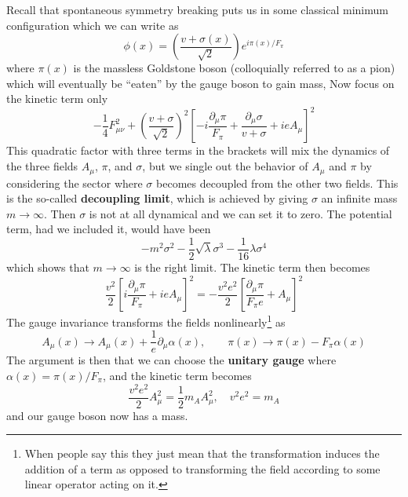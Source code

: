 \documentclass{report}
\begin{document}
 Recall that spontaneous symmetry breaking puts us in
some classical minimum configuration which we can write as 
\begin{equation*}
	\phi(x) = \left(\frac{v+\sigma(x)}{\sqrt{2}}\right) e^{i\pi(x)/F_\pi}
\end{equation*}
where $ \pi(x) $ is the massless Goldstone boson (colloquially referred to as a pion) which will eventually be 
``eaten'' by the gauge boson to gain mass,
Now focus on the kinetic term only
\begin{equation*}
	-\frac{1}{4} F_{\mu\nu}^2 +  \left(\frac{v+\sigma}{\sqrt{2}}\right)^2 
		\left[-i \frac{\partial_\mu \pi}{F_\pi} + \frac{\partial_\mu \sigma}{v+\sigma}
			+ ieA_\mu\right]^2
\end{equation*}
This quadratic factor with three terms in the brackets will mix the dynamics 
of the three fields $ A_\mu $, $ \pi $, and $ \sigma $, but we single out the 
behavior of $ A_\mu $ and $ \pi $ by considering the sector where $ \sigma $
becomes decoupled from the other two fields. This is the so-called \textbf{decoupling 
limit}, which is achieved by giving $ \sigma $ an infinite mass $ m \rightarrow \infty $. 
Then $ \sigma $ is not at all dynamical and we can set it to zero. 
The potential term, had we included it, would have been 
\begin{equation*}
	-m^2 \sigma^2 - \frac{1}{2}\sqrt{\lambda} \sigma^3
		- \frac{1}{16}\lambda\sigma^4
\end{equation*}
which shows that $ m \rightarrow \infty $ is the right limit. The kinetic 
term then becomes 
\begin{equation*}
	\frac{v^2}{2}\left[i \frac{\partial_\mu \pi}{F_\pi} + ieA_\mu\right]^2
	= -
	\frac{v^2e^2}{2}\left[ \frac{\partial_\mu \pi}{F_\pi e} + A_\mu\right]^2
\end{equation*}
The gauge invariance transforms the fields nonlinearly\footnote{When people say
this they just mean that the transformation induces the addition of a term as
opposed to transforming the field according to some 
linear operator acting on it.} as 
\begin{equation*}
	A_\mu(x) \rightarrow  A_\mu(x) + \frac{1}{e}\partial_\mu \alpha(x),\qquad 
	\pi(x) \rightarrow \pi(x) - F_\pi \alpha(x)
\end{equation*}
The argument is then that we can choose the \textbf{unitary gauge} where 
$ \alpha (x) = \pi(x)/F_\pi  $, and the kinetic term becomes 
\begin{equation*}
	\frac{v^2 e^2}{2}A_\mu^2 = \frac{1}{2}m_A A_\mu^2,\quad v^2 e^2 = m_A
\end{equation*}
and our gauge boson now has a mass. 
\end{document}
